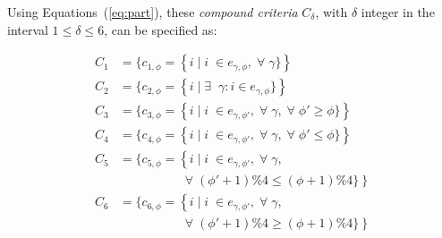 \documentclass[%
	aip,
	jmp,%
	amsmath,amssymb,
	reprint,%
]{revtex4-1}
\begin{document}
																																																																																Using Equations~(\ref{eq:part}), these \emph{compound criteria} $C_\delta$, with $\delta$ integer in the interval $1\leq\delta\leq6$, can be specified as:

																																																																																\begin{equation}
																																																																																	\begin{split}
																																																																																		C_1&=\{c_{1,\phi}=\left\{i\mid i\;\in e_{\gamma,\phi}, \;\forall\; \gamma\}\right\} \\
																																																																																		C_2&=\{c_{2,\phi}=\left\{i\mid \exists \;\;\gamma: i \in e_{\gamma,\phi}\}\right\} \\
																																																																																		C_3&=\{c_{3,\phi}=\left\{i\mid i\;\in e_{\gamma,\phi'}, \;\forall\; \gamma,\;\forall\;\phi'\geq \phi\}\right\} \\
																																																																																		C_4&=\{c_{4,\phi}=\left\{i\mid i\;\in e_{\gamma,\phi'}, \;\forall\; \gamma,\;\forall\;\phi'\leq \phi\}\right\} \\
																																																																																		C_5&=\{c_{5,\phi}=\left\{i\mid i\;\in e_{\gamma,\phi'}, \;\forall\; \gamma,\right.\\
																																																																																																																															       &\;\;\;\;\;\;\;\;\;\;\;\;\;\;\;\;\;\; \left.\;\forall\;(\phi'+1)\%4\leq (\phi+1)\%4\}\right\} \\
																																																																																		C_6&=\{c_{6,\phi}=\left\{i\mid i\;\in e_{\gamma,\phi'}, \;\forall\; \gamma,\right.\\
																																																																																																																															       &\;\;\;\;\;\;\;\;\;\;\;\;\;\;\;\;\;\; \left.\;\forall\;(\phi'+1)\%4\geq (\phi+1)\%4\}\right\} \\
																																																																																	\end{split}
																																																																																\end{equation}
\end{document}
